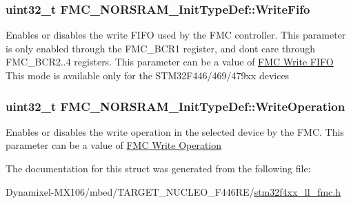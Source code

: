 \subsubsection[{\texorpdfstring{Write\+Fifo}{WriteFifo}}]{\setlength{\rightskip}{0pt plus 5cm}uint32\+\_\+t F\+M\+C\+\_\+\+N\+O\+R\+S\+R\+A\+M\+\_\+\+Init\+Type\+Def\+::\+Write\+Fifo}\hypertarget{struct_f_m_c___n_o_r_s_r_a_m___init_type_def_a63aa26b1c1e61a2ac9b9e59d0b2c7b9d}{}\label{struct_f_m_c___n_o_r_s_r_a_m___init_type_def_a63aa26b1c1e61a2ac9b9e59d0b2c7b9d}
Enables or disables the write F\+I\+FO used by the F\+MC controller. This parameter is only enabled through the F\+M\+C\+\_\+\+B\+C\+R1 register, and don\textquotesingle{}t care through F\+M\+C\+\_\+\+B\+C\+R2..4 registers. This parameter can be a value of \hyperlink{group___f_m_c___write___f_i_f_o}{F\+MC Write F\+I\+FO} This mode is available only for the S\+T\+M32\+F446/469/479xx devices 
\subsubsection[{\texorpdfstring{Write\+Operation}{WriteOperation}}]{\setlength{\rightskip}{0pt plus 5cm}uint32\+\_\+t F\+M\+C\+\_\+\+N\+O\+R\+S\+R\+A\+M\+\_\+\+Init\+Type\+Def\+::\+Write\+Operation}\hypertarget{struct_f_m_c___n_o_r_s_r_a_m___init_type_def_a71050a4b16715f3acf90c4a7b92fd91f}{}\label{struct_f_m_c___n_o_r_s_r_a_m___init_type_def_a71050a4b16715f3acf90c4a7b92fd91f}
Enables or disables the write operation in the selected device by the F\+MC. This parameter can be a value of \hyperlink{group___f_m_c___write___operation}{F\+MC Write Operation} 

The documentation for this struct was generated from the following file\+:\begin{DoxyCompactItemize}
\item 
Dynamixel-\/\+M\+X106/mbed/\+T\+A\+R\+G\+E\+T\+\_\+\+N\+U\+C\+L\+E\+O\+\_\+\+F446\+R\+E/\hyperlink{stm32f4xx__ll__fmc_8h}{stm32f4xx\+\_\+ll\+\_\+fmc.\+h}\end{DoxyCompactItemize}
